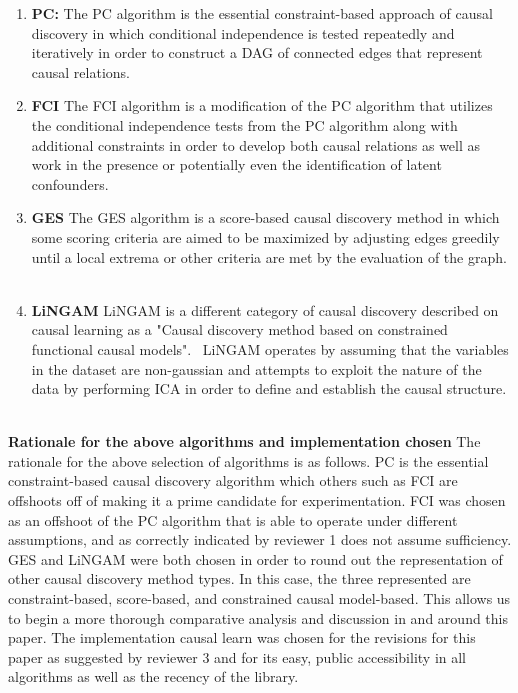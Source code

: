 \documentclass[]{svjour3}
\begin{document}
\begin{enumerate}
    \item \textbf{PC:} The PC algorithm is the essential constraint-based approach of causal discovery in which conditional independence is tested repeatedly and iteratively in order to construct a DAG of connected edges that represent causal relations. ~\cite{spirtes2001causation}
    \item \textbf{FCI} The FCI algorithm is a modification of the PC algorithm that utilizes the conditional independence tests from the PC algorithm along with additional constraints in order to develop both causal relations as well as work in the presence or potentially even the identification of latent confounders.~\cite{spirtes2013causal}
    \item \textbf{GES} The GES algorithm is a score-based causal discovery method in which some scoring criteria are aimed to be maximized by adjusting edges greedily until a local extrema or other criteria are met by the evaluation of the graph. ~\cite{chickering2002optimal}
    \item \textbf{LiNGAM} LiNGAM is a different category of causal discovery described on causal learning as a "Causal discovery method based on constrained functional causal models".~\cite{zheng2024causal} LiNGAM operates by assuming that the variables in the dataset are non-gaussian and attempts to exploit the nature of the data by performing ICA in order to define and establish the causal structure. ~\cite{shimizu2006linear}
\end{enumerate}
\textbf{Rationale for the above algorithms and implementation chosen} The rationale for the above selection of algorithms is as follows.  PC is the essential constraint-based causal discovery algorithm which others such as FCI are offshoots off of making it a prime candidate for experimentation.  FCI was chosen as an offshoot of the PC algorithm that is able to operate under different assumptions, and as correctly indicated by reviewer 1 does not assume sufficiency.  GES and LiNGAM were both chosen in order to round out the representation of other causal discovery method types.  In this case, the three represented are constraint-based, score-based, and constrained causal model-based.  This allows us to begin a more thorough comparative analysis and discussion in and around this paper.  The implementation causal learn was chosen for the revisions for this paper as suggested by reviewer 3 and for its easy, public accessibility in all algorithms as well as the recency of the library. ~\cite{zheng2024causal}
\end{document}
